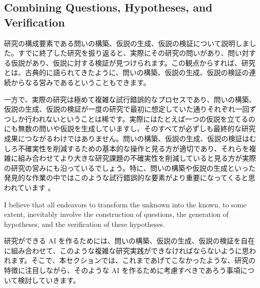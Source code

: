 \subsection{Combining Questions, Hypotheses, and Verification}

研究の構成要素である問いの構築、仮説の生成、仮説の検証について説明しました。すでに終了した研究を振り返ると、実際にその研究の問いがあり、問い対する仮説があり、仮説に対する検証が見つけられます。この観点からすれば、研究とは、古典的に語られてきたように、問いの構築、仮説の生成、仮説の検証の連続からなる営みであるということもできます。

一方で、実際の研究は極めて複雑な試行錯誤的なプロセスであり、問いの構築、仮説の生成、仮説の検証が一度の研究で最初に想定していた通りそれぞれ一回ずつしか行われないということは稀です。実際にはたとえば一つの仮説を立てるのにも無数の問いや仮説を生成していますし、そのすべてが必ずしも最終的な研究成果につながるわけではありません。問いの構築、仮説の生成、仮説の検証はむしろ不確実性を削減するための基本的な操作と見る方が適切であり、それらを複雑に組み合わせてより大きな研究課題の不確実性を削減していると見る方が実際の研究の営みにも沿っているでしょう。特に、問いの構築や仮説の生成といった発見的な作業の中ではこのような試行錯誤的な要素がより重要になってくると思われています \cite{yanai2020hypothesis}。

I believe that all endeavors to transform the unknown into the known, to some extent, inevitably involve the construction of questions, the generation of hypotheses, and the verification of these hypotheses.

研究ができる AI を作るためには、問いの構築、仮説の生成、仮説の検証を自在に組み合わせて、このような複雑な研究実践ができなければならないように思われます。そこで、本セクションでは、これまであげてこなかったような、研究の特徴に注目しながら、そのような AI を作るために考慮すべきであろう事項について検討していきます。



